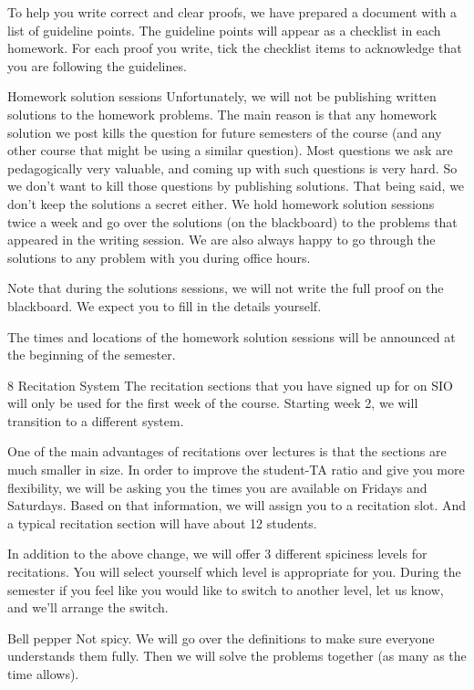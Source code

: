 To help you write correct and clear proofs, we have prepared a document with a list of guideline points. The guideline points will appear as a checklist in each homework. For each proof you write, tick the checklist items to acknowledge that you are following the guidelines.

 
Homework solution sessions
Unfortunately, we will not be publishing written solutions to the homework problems. The main reason is that any homework solution we post kills the question for future semesters of the course (and any other course that might be using a similar question). Most questions we ask are pedagogically very valuable, and coming up with such questions is very hard. So we don’t want to kill those questions by publishing solutions. That being said, we don’t keep the solutions a secret either. We hold homework solution sessions twice a week and go over the solutions (on the blackboard) to the problems that appeared in the writing session. We are also always happy to go through the solutions to any problem with you during office hours.

Note that during the solutions sessions, we will not write the full proof on the blackboard. We expect you to fill in the details yourself.

The times and locations of the homework solution sessions will be announced at the beginning of the semester.

 
8  Recitation System
The recitation sections that you have signed up for on SIO will only be used for the first week of the course. Starting week 2, we will transition to a different system.

One of the main advantages of recitations over lectures is that the sections are much smaller in size. In order to improve the student-TA ratio and give you more flexibility, we will be asking you the times you are available on Fridays and Saturdays. Based on that information, we will assign you to a recitation slot. And a typical recitation section will have about 12 students.

In addition to the above change, we will offer 3 different spiciness levels for recitations. You will select yourself which level is appropriate for you. During the semester if you feel like you would like to switch to another level, let us know, and we’ll arrange the switch.

Bell pepper Not spicy. We will go over the definitions to make sure everyone understands them fully. Then we will solve the problems together (as many as the time allows).

